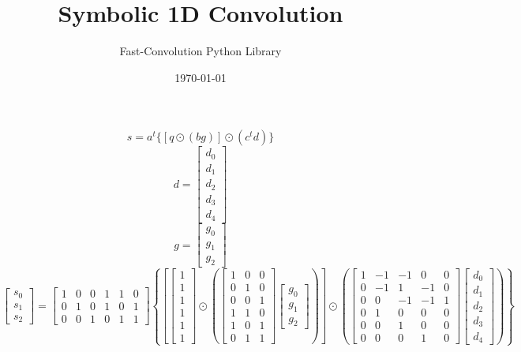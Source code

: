 \documentclass{article}%
\title{Symbolic 1D Convolution}%
\author{Fast{-}Convolution Python Library}%
\date{\today}%
\begin{document}
%
\normalsize%
\maketitle%
\[%
s = a^t \{[q \odot (bg)] \odot (c^t d)\}%
\]%
\[%
d = \left[\begin{matrix}d_{0}\\d_{1}\\d_{2}\\d_{3}\\d_{4}\end{matrix}\right]%
\]%
\[%
g = \left[\begin{matrix}g_{0}\\g_{1}\\g_{2}\end{matrix}\right]%
\]%
\[%
\left[\begin{matrix}s_{0}\\s_{1}\\s_{2}\end{matrix}\right] = \left[\begin{matrix}1 & 0 & 0 & 1 & 1 & 0\\0 & 1 & 0 & 1 & 0 & 1\\0 & 0 & 1 & 0 & 1 & 1\end{matrix}\right] \left\{ \left[ \left[\begin{matrix}1\\1\\1\\1\\1\\1\end{matrix}\right] \odot \left( \left[\begin{matrix}1 & 0 & 0\\0 & 1 & 0\\0 & 0 & 1\\1 & 1 & 0\\1 & 0 & 1\\0 & 1 & 1\end{matrix}\right] \left[\begin{matrix}g_{0}\\g_{1}\\g_{2}\end{matrix}\right] \right) \right] \odot \left( \left[\begin{matrix}1 & -1 & -1 & 0 & 0\\0 & -1 & 1 & -1 & 0\\0 & 0 & -1 & -1 & 1\\0 & 1 & 0 & 0 & 0\\0 & 0 & 1 & 0 & 0\\0 & 0 & 0 & 1 & 0\end{matrix}\right] \left[\begin{matrix}d_{0}\\d_{1}\\d_{2}\\d_{3}\\d_{4}\end{matrix}\right] \right) \right\}%
\]%
\end{document}
